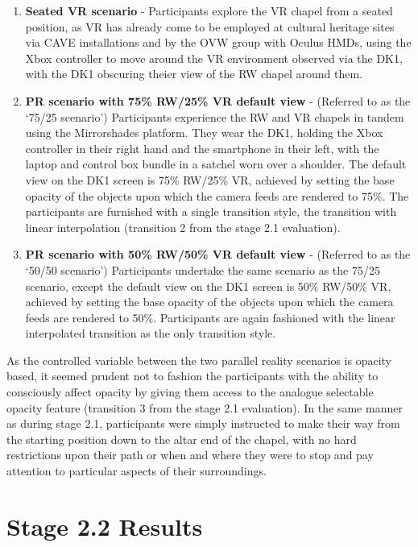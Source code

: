 \begin{enumerate}
	\item \textbf{Seated VR scenario} - Participants explore the VR chapel from a seated position, as VR has already come to be employed at cultural heritage sites via CAVE installations and by the OVW group with Oculus HMDs, using the Xbox controller to move around the VR environment observed via the DK1, with the DK1 obscuring theier view of the RW chapel around them.
	\item \textbf{PR scenario with 75\% RW/25\% VR default view} - (Referred to as the `75/25 scenario') Participants experience the RW and VR chapels in tandem using the Mirrorshades platform. They wear the DK1, holding the Xbox controller in their right hand and the smartphone in their left, with the laptop and control box bundle in a satchel worn over a shoulder. The default view on the DK1 screen is 75\% RW/25\% VR, achieved by setting the base opacity of the objects upon which the camera feeds are rendered to 75\%. The participants are furnished with a single transition style, the transition with linear interpolation (transition 2 from the stage 2.1 evaluation).
	\item \textbf{PR scenario with 50\% RW/50\% VR default view} - (Referred to as the `50/50 scenario') Participants undertake the same scenario as the 75/25 scenario, except the default view on the DK1 screen is 50\% RW/50\% VR, achieved by setting the base opacity of the objects upon which the camera feeds are rendered to 50\%. Participants are again fashioned with the linear interpolated transition as the only transition style.
\end{enumerate}

As the controlled variable between the two parallel reality scenarios is opacity based, it seemed prudent not to fashion the participants with the ability to consciously affect opacity by giving them access to the analogue selectable opacity feature (transition 3 from the stage 2.1 evaluation). In the same manner as during stage 2.1, participants were simply instructed to make their way from the starting position down to the altar end of the chapel, with no hard restrictions upon their path or when and where they were to stop and pay attention to particular aspects of their surroundings.


\section{Stage 2.2 Results}

